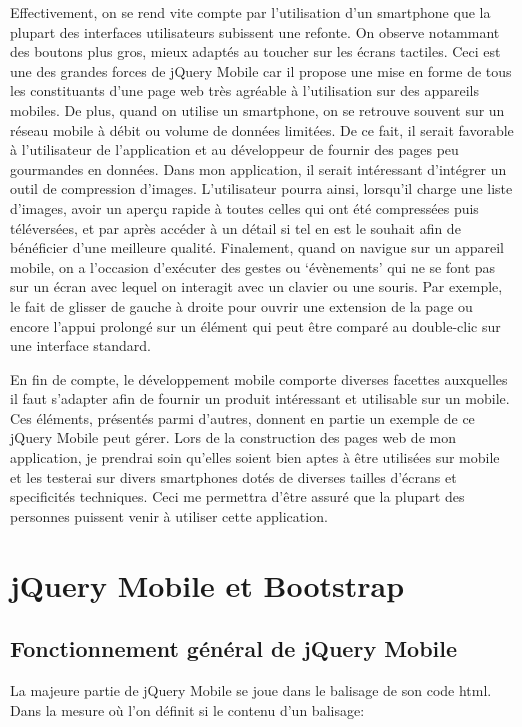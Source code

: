 \documentclass[a4paper,12pt,oneside]{sphinxmanual}
\begin{document}
Effectivement, on se rend vite compte par l'utilisation d'un smartphone que la
plupart des interfaces utilisateurs subissent une refonte. On observe notammant
des boutons plus gros, mieux adaptés au toucher sur les écrans tactiles.
Ceci est une des grandes forces de jQuery Mobile car il propose une mise en forme de tous
les constituants d'une page web très agréable à l'utilisation sur des appareils mobiles.
De plus, quand on utilise un smartphone, on se retrouve souvent sur un réseau
mobile à débit ou volume de données limitées. De ce fait, il serait favorable à
l'utilisateur de l'application et au développeur de fournir des pages peu gourmandes en données.
Dans mon application, il serait intéressant d'intégrer un outil de compression d'images.
L'utilisateur pourra ainsi, lorsqu'il charge une liste d'images, avoir
un aperçu rapide à toutes celles qui ont été compressées puis téléversées, et par après accéder
à un détail si tel en est le souhait afin de bénéficier d'une meilleure qualité.
Finalement, quand on navigue sur un appareil mobile, on a l'occasion d'exécuter
des gestes ou `évènements' qui ne se font pas sur un écran avec lequel on interagit
avec un clavier ou une souris. Par exemple, le fait de glisser de gauche à droite
pour ouvrir une extension de la page ou encore l'appui prolongé sur un élément
qui peut être comparé au double-clic sur une interface standard.

En fin de compte, le développement mobile comporte diverses facettes auxquelles il faut
s'adapter afin de fournir un produit intéressant et utilisable sur un mobile. Ces éléments, présentés
parmi d'autres, donnent en partie un exemple de ce jQuery Mobile peut gérer.
Lors de la construction des pages web de mon application, je prendrai soin
qu'elles soient bien aptes à être utilisées sur mobile et les testerai sur divers smartphones
dotés de diverses tailles d'écrans et specificités techniques. Ceci me permettra d'être assuré que la
plupart des personnes puissent venir à utiliser cette application.


\chapter{jQuery Mobile et Bootstrap}
\label{Diff_xe9rence_jQM_boot::doc}\label{Diff_xe9rence_jQM_boot:jquery-mobile-et-bootstrap}

\section{Fonctionnement général de jQuery Mobile}
\label{Diff_xe9rence_jQM_boot:fonctionnement-general-de-jquery-mobile}
La majeure partie de jQuery Mobile se joue dans le balisage de son code html.
Dans la mesure où l'on définit si le contenu d'un balisage:
\end{document}
